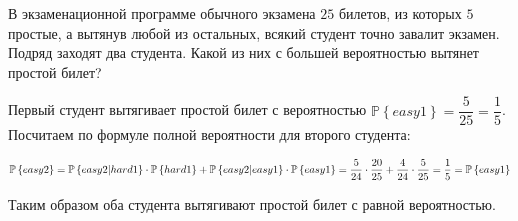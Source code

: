 \documentclass[a4paper,12pt]{article}
\newcommand{\prob}[1]{\mathbb{P}\left\{#1\right\}}
\begin{document}
\begin{tasknum}{8}
	В экзаменационной программе обычного экзамена $25$ билетов, из которых $5$ простые, а вытянув любой из остальных, всякий студент точно завалит экзамен. Подряд заходят два студента. Какой из них с большей вероятностью вытянет простой билет?
\end{tasknum}

\begin{solution}
	Первый студент вытягивает простой билет с вероятностью $\prob{easy1} = \dfrac{5}{25} = \dfrac{1}{5}$. Посчитаем по формуле полной вероятности для второго студента:
	
	$\prob{easy2} = \prob{easy2 | hard 1} \cdot \prob{hard1} + \prob{easy2 | easy 1} \cdot \prob{easy1} =  \dfrac{5}{24} \cdot \dfrac{20}{25} + \dfrac{4}{24} \cdot \dfrac{5}{25} = \dfrac{1}{5} \hm{=} \prob{easy1}$
	
	Таким образом оба студента вытягивают простой билет с равной вероятностью.
\end{solution}
\end{document}

